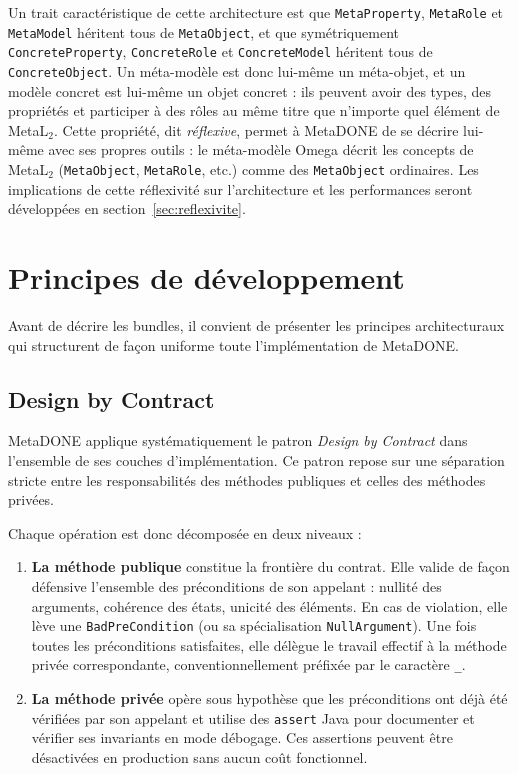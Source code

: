 Un trait caractéristique de cette architecture est que \texttt{MetaProperty}, \texttt{MetaRole} et \texttt{MetaModel} héritent tous de \texttt{MetaObject}, et que symétriquement \texttt{ConcreteProperty}, \texttt{ConcreteRole} et \texttt{ConcreteModel} héritent tous de \texttt{ConcreteObject}. Un méta-modèle est donc lui-même un méta-objet, et un modèle concret est lui-même un objet concret : ils peuvent avoir des types, des propriétés et participer à des rôles au même titre que n'importe quel élément de MetaL$_2$.  Cette propriété, dit \emph{réflexive}, permet à MetaDONE de se décrire lui-même avec ses propres outils : le méta-modèle Omega décrit les concepts de MetaL$_2$ (\texttt{MetaObject}, \texttt{MetaRole}, etc.) comme des \texttt{MetaObject} ordinaires. Les implications de cette réflexivité sur l'architecture et les performances seront développées en section~\ref{sec:reflexivite}.

\section{Principes de développement}

Avant de décrire les bundles, il convient de présenter les principes architecturaux qui structurent de façon uniforme toute l'implémentation de MetaDONE.

\subsection{Design by Contract}
\label{sec:dbc}

MetaDONE applique systématiquement le patron \emph{Design by Contract} dans l'ensemble de ses couches d'implémentation. Ce
patron repose sur une séparation stricte entre les responsabilités des
méthodes publiques et celles des méthodes privées.

Chaque opération est donc décomposée en deux niveaux :
\begin{enumerate}
    \item \textbf{La méthode publique} constitue la frontière du contrat.
    Elle valide de façon défensive l'ensemble des préconditions de son
    appelant : nullité des arguments, cohérence des états, unicité des
    éléments. En cas de violation, elle lève une \texttt{BadPreCondition} (ou sa spécialisation \texttt{NullArgument}).
    Une fois toutes les préconditions satisfaites, elle délègue le travail effectif à la méthode privée correspondante, conventionnellement préfixée par le caractère \texttt{\_}.

    \item \textbf{La méthode privée} opère sous hypothèse que les
    préconditions ont déjà été vérifiées par son appelant et utilise des \texttt{assert} Java pour documenter et vérifier ses invariants en mode débogage. Ces assertions peuvent être désactivées en production
    sans aucun coût fonctionnel.
\end{enumerate}

